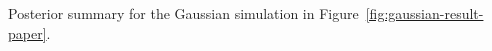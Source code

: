 \begin{table}[!htbp]
\centering
\small

\caption{Posterior summary for the Gaussian simulation in Figure~\ref{fig:gaussian-result-paper}.}
\label{tab:gaussian-summary-paper}
\end{table}
